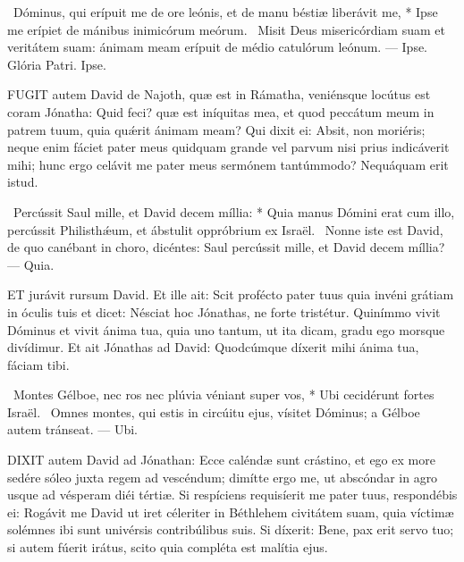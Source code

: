 \R\ Dóminus, qui erípuit me de ore leónis, et de manu béstiæ liberávit me, * Ipse me erípiet de mánibus inimicórum meórum. \V\ Misit Deus misericórdiam suam et veritátem suam: ánimam meam erípuit de médio catulórum leónum. --- Ipse. Glória Patri. Ipse.




\lettrine[lines=2]{F}{UGIT} autem David de Najoth, quæ est in Rámatha, veniénsque locútus est coram Jónatha: Quid feci? quæ est iníquitas mea, et quod peccátum meum in patrem tuum, quia quǽrit ánimam meam? Qui dixit ei: Absit, non moriéris; neque enim fáciet pater meus quidquam grande vel parvum nisi prius indicáverit mihi; hunc ergo celávit me pater meus sermónem tantúmmodo? Nequáquam erit istud.

\R\ Percússit Saul mille, et David decem míllia: * Quia manus Dómini erat cum illo, percússit Philisthǽum, et ábstulit oppróbrium ex Israël. \V\ Nonne iste est David, de quo canébant in choro, dicéntes: Saul percússit mille, et David decem míllia? --- Quia.


\lettrine[lines=2]{E}{T} jurávit rursum David. Et ille ait: Scit profécto pater tuus quia invéni grátiam in óculis tuis et dicet: Nésciat hoc Jónathas, ne forte tristétur. Quinímmo vivit Dóminus et vivit ánima tua, quia uno tantum, ut ita dicam, gradu ego morsque divídimur. Et ait Jónathas ad David: Quodcúmque díxerit mihi ánima tua, fáciam tibi.

\R\ Montes Gélboe, nec ros nec plúvia véniant super vos, * Ubi cecidérunt fortes Israël. \V\ Omnes montes, qui estis in circúitu ejus, vísitet Dóminus; a Gélboe autem tránseat. --- Ubi.



\lettrine[lines=2]{D}{IXIT} autem David ad Jónathan: Ecce caléndæ sunt crástino, et ego ex more sedére sóleo juxta regem ad vescéndum; dimítte ergo me, ut abscóndar in agro usque ad vésperam diéi tértiæ. Si respíciens requisíerit me pater tuus, respondébis ei: Rogávit me David ut iret céleriter in Béthlehem civitátem suam, quia víctimæ solémnes ibi sunt univérsis contribúlibus suis. Si díxerit: Bene, pax erit servo tuo; si autem fúerit irátus, scito quia compléta est malítia ejus.

